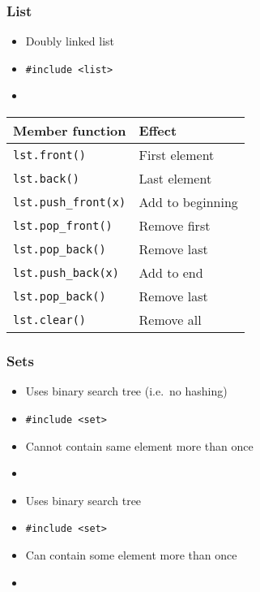 \begin{frame}
  \frametitle{List}
  \begin{itemize}
    \item Doubly linked list
    \item \texttt{\#include <list>}
    \item {}
  \end{itemize}
  \begin{center}
    \begin{tabular}{ll}
      \textbf{Member function} & \textbf{Effect} \\
      \toprule
      \texttt{lst.front()}        & First element \\
      \texttt{lst.back()}         & Last element \\
      \texttt{lst.push\_front(x)} & Add to beginning \\
      \texttt{lst.pop\_front()}   & Remove first \\
      \texttt{lst.pop\_back()}    & Remove last \\
      \texttt{lst.push\_back(x)}  & Add to end \\
      \texttt{lst.pop\_back()}    & Remove last \\
      \texttt{lst.clear()}        & Remove all \\
    \end{tabular}
  \end{center}
\end{frame}

\begin{frame}
  \frametitle{Sets}
  \begin{itemize}
    \item Uses binary search tree (i.e.~no hashing)
    \item \texttt{\#include <set>}
    \item Cannot contain same element more than once
    \item {}
  \end{itemize}
  \vskip5mm
  \begin{itemize}
    \item Uses binary search tree
    \item \texttt{\#include <set>}
    \item Can contain some element more than once
    \item {}
  \end{itemize}
\end{frame}

